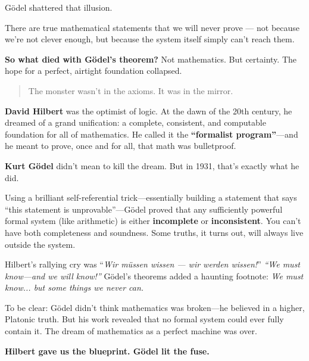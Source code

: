Gödel shattered that illusion.

There are true mathematical statements that we will never prove — not because we’re not clever enough, but because the system itself simply can’t reach them.

\medskip

\noindent\textbf{So what died with Gödel’s theorem?} Not mathematics. But certainty. The hope for a perfect, airtight foundation collapsed.

\begin{quote}
The monster wasn’t in the axioms. It was in the mirror.
\end{quote}


\begin{tcolorbox}[colback=blue!5!white, colframe=blue!50!black, 
  title={Historical Sidebar: Gödel and Hilbert—The Dream and the Detonation}]
  
  \textbf{David Hilbert} was the optimist of logic. At the dawn of the 20th century, he dreamed of a grand unification: a complete, consistent, and computable foundation for all of mathematics. He called it the \textbf{“formalist program”}—and he meant to prove, once and for all, that math was bulletproof.
  
  \medskip
  
  \textbf{Kurt Gödel} didn’t mean to kill the dream. But in 1931, that’s exactly what he did.
  
  Using a brilliant self-referential trick—essentially building a statement that says “this statement is unprovable”—Gödel proved that any sufficiently powerful formal system (like arithmetic) is either \textbf{incomplete} or \textbf{inconsistent}. You can’t have both completeness and soundness. Some truths, it turns out, will always live outside the system.
  
  \medskip
  
  Hilbert’s rallying cry was “\textit{Wir müssen wissen — wir werden wissen!}”  
  \emph{“We must know—and we will know!”}  
  Gödel’s theorems added a haunting footnote:  
  \emph{We must know... but some things we never can.}
  
  \medskip
  
  To be clear: Gödel didn’t think mathematics was broken—he believed in a higher, Platonic truth. But his work revealed that no formal system could ever fully contain it. The dream of mathematics as a perfect machine was over.
  
  \medskip
  
  \textbf{Hilbert gave us the blueprint. Gödel lit the fuse.}
  
\end{tcolorbox}


